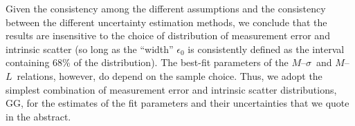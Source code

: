 \documentclass[twosided,letterpaper,numberedappendix]{emulateapj}
\newcommand{\msigma}   {\ensuremath{M}{--}\ensuremath{\sigma}}
\newcommand{\ml}       {\ensuremath{M}{--}\ensuremath{L}}
\begin{document}
Given the consistency among the different assumptions and the
consistency between the different uncertainty estimation methods, we
conclude that the results are insensitive to the choice of
distribution of measurement error and intrinsic scatter (so long as
the ``width'' $\epsilon_0$ is consistently defined as the interval
containing 68\% of the distribution).  The best-fit parameters of the
\msigma\ and \ml\ relations, however, do depend on the sample choice.
Thus, we adopt the simplest combination of measurement error and
intrinsic scatter distributions, GG, for the estimates of the fit
parameters and their uncertainties that we quote in the abstract.

\eject





\clearpage
\LongTables
\end{document}
